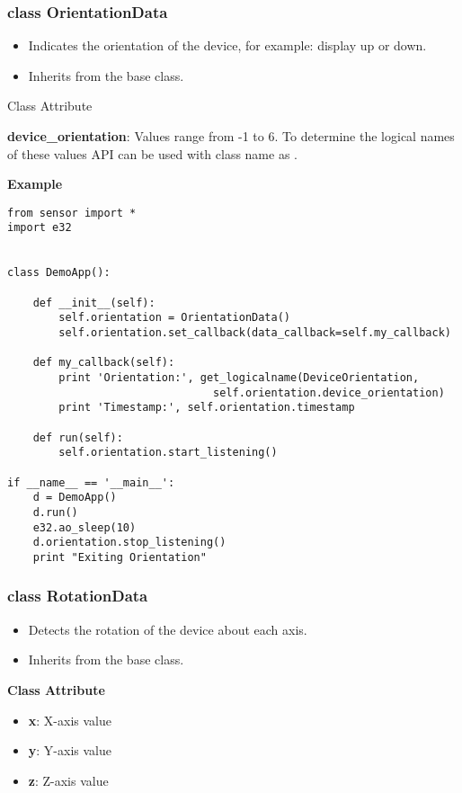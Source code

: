 \subsubsection{class OrientationData}

\begin{itemize}
\item Indicates the orientation of the device, for example: display up or down.
\item Inherits from the  base class.
\end{itemize}

{Class Attribute} \break

{\bf device_orientation}: Values range from -1 to 6. To determine the logical names of these values  API can be used with class name as .

{\bf Example} \break

\begin{verbatim}
from sensor import *
import e32


class DemoApp():

    def __init__(self):
        self.orientation = OrientationData()
        self.orientation.set_callback(data_callback=self.my_callback)

    def my_callback(self):
        print 'Orientation:', get_logicalname(DeviceOrientation,
                                self.orientation.device_orientation)
        print 'Timestamp:', self.orientation.timestamp

    def run(self):
        self.orientation.start_listening()

if __name__ == '__main__':
    d = DemoApp()
    d.run()
    e32.ao_sleep(10)
    d.orientation.stop_listening()
    print "Exiting Orientation"
\end{verbatim}

\subsubsection{class RotationData}

\begin{itemize}
\item Detects the rotation of the device about each axis.
\item Inherits from the  base class.
\end{itemize}

{\bf Class Attribute} \break

\begin{itemize}
\item {\bf x}: X-axis value
\item {\bf y}: Y-axis value
\item {\bf z}: Z-axis value
\end{itemize}

